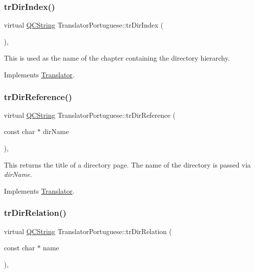 \subsubsection{\texorpdfstring{trDirIndex()}{trDirIndex()}}
{\footnotesize\ttfamily virtual \mbox{\hyperlink{class_q_c_string}{Q\+C\+String}} Translator\+Portuguese\+::tr\+Dir\+Index (\begin{DoxyParamCaption}{ }\end{DoxyParamCaption})\hspace{0.3cm}{\ttfamily [inline]}, {\ttfamily [virtual]}}

This is used as the name of the chapter containing the directory hierarchy. 

Implements \mbox{\hyperlink{class_translator}{Translator}}.

\mbox{\label{class_translator_portuguese_a4a104b57f0aff72824762e51cb3b4ae9}} 
\subsubsection{\texorpdfstring{trDirReference()}{trDirReference()}}
{\footnotesize\ttfamily virtual \mbox{\hyperlink{class_q_c_string}{Q\+C\+String}} Translator\+Portuguese\+::tr\+Dir\+Reference (\begin{DoxyParamCaption}\item[{const char $\ast$}]{dir\+Name }\end{DoxyParamCaption})\hspace{0.3cm}{\ttfamily [inline]}, {\ttfamily [virtual]}}

This returns the title of a directory page. The name of the directory is passed via {\itshape dir\+Name}. 

Implements \mbox{\hyperlink{class_translator}{Translator}}.

\mbox{\label{class_translator_portuguese_a89df3c9ffb220e05e00e82bea17f0989}} 
\subsubsection{\texorpdfstring{trDirRelation()}{trDirRelation()}}
{\footnotesize\ttfamily virtual \mbox{\hyperlink{class_q_c_string}{Q\+C\+String}} Translator\+Portuguese\+::tr\+Dir\+Relation (\begin{DoxyParamCaption}\item[{const char $\ast$}]{name }\end{DoxyParamCaption})\hspace{0.3cm}{\ttfamily [inline]}, {\ttfamily [virtual]}}

